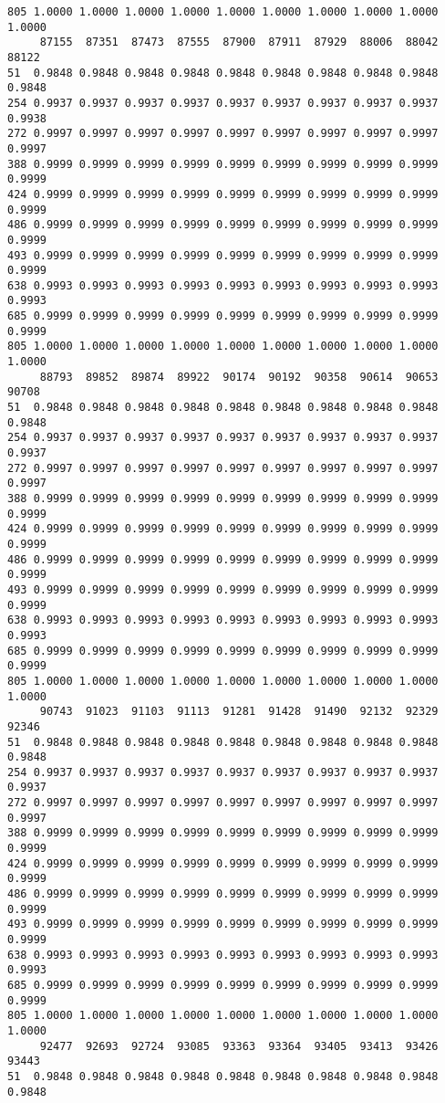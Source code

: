 \documentclass[
]{report}
\begin{document}
\begin{verbatim}
805 1.0000 1.0000 1.0000 1.0000 1.0000 1.0000 1.0000 1.0000 1.0000 1.0000
     87155  87351  87473  87555  87900  87911  87929  88006  88042  88122
51  0.9848 0.9848 0.9848 0.9848 0.9848 0.9848 0.9848 0.9848 0.9848 0.9848
254 0.9937 0.9937 0.9937 0.9937 0.9937 0.9937 0.9937 0.9937 0.9937 0.9938
272 0.9997 0.9997 0.9997 0.9997 0.9997 0.9997 0.9997 0.9997 0.9997 0.9997
388 0.9999 0.9999 0.9999 0.9999 0.9999 0.9999 0.9999 0.9999 0.9999 0.9999
424 0.9999 0.9999 0.9999 0.9999 0.9999 0.9999 0.9999 0.9999 0.9999 0.9999
486 0.9999 0.9999 0.9999 0.9999 0.9999 0.9999 0.9999 0.9999 0.9999 0.9999
493 0.9999 0.9999 0.9999 0.9999 0.9999 0.9999 0.9999 0.9999 0.9999 0.9999
638 0.9993 0.9993 0.9993 0.9993 0.9993 0.9993 0.9993 0.9993 0.9993 0.9993
685 0.9999 0.9999 0.9999 0.9999 0.9999 0.9999 0.9999 0.9999 0.9999 0.9999
805 1.0000 1.0000 1.0000 1.0000 1.0000 1.0000 1.0000 1.0000 1.0000 1.0000
     88793  89852  89874  89922  90174  90192  90358  90614  90653  90708
51  0.9848 0.9848 0.9848 0.9848 0.9848 0.9848 0.9848 0.9848 0.9848 0.9848
254 0.9937 0.9937 0.9937 0.9937 0.9937 0.9937 0.9937 0.9937 0.9937 0.9937
272 0.9997 0.9997 0.9997 0.9997 0.9997 0.9997 0.9997 0.9997 0.9997 0.9997
388 0.9999 0.9999 0.9999 0.9999 0.9999 0.9999 0.9999 0.9999 0.9999 0.9999
424 0.9999 0.9999 0.9999 0.9999 0.9999 0.9999 0.9999 0.9999 0.9999 0.9999
486 0.9999 0.9999 0.9999 0.9999 0.9999 0.9999 0.9999 0.9999 0.9999 0.9999
493 0.9999 0.9999 0.9999 0.9999 0.9999 0.9999 0.9999 0.9999 0.9999 0.9999
638 0.9993 0.9993 0.9993 0.9993 0.9993 0.9993 0.9993 0.9993 0.9993 0.9993
685 0.9999 0.9999 0.9999 0.9999 0.9999 0.9999 0.9999 0.9999 0.9999 0.9999
805 1.0000 1.0000 1.0000 1.0000 1.0000 1.0000 1.0000 1.0000 1.0000 1.0000
     90743  91023  91103  91113  91281  91428  91490  92132  92329  92346
51  0.9848 0.9848 0.9848 0.9848 0.9848 0.9848 0.9848 0.9848 0.9848 0.9848
254 0.9937 0.9937 0.9937 0.9937 0.9937 0.9937 0.9937 0.9937 0.9937 0.9937
272 0.9997 0.9997 0.9997 0.9997 0.9997 0.9997 0.9997 0.9997 0.9997 0.9997
388 0.9999 0.9999 0.9999 0.9999 0.9999 0.9999 0.9999 0.9999 0.9999 0.9999
424 0.9999 0.9999 0.9999 0.9999 0.9999 0.9999 0.9999 0.9999 0.9999 0.9999
486 0.9999 0.9999 0.9999 0.9999 0.9999 0.9999 0.9999 0.9999 0.9999 0.9999
493 0.9999 0.9999 0.9999 0.9999 0.9999 0.9999 0.9999 0.9999 0.9999 0.9999
638 0.9993 0.9993 0.9993 0.9993 0.9993 0.9993 0.9993 0.9993 0.9993 0.9993
685 0.9999 0.9999 0.9999 0.9999 0.9999 0.9999 0.9999 0.9999 0.9999 0.9999
805 1.0000 1.0000 1.0000 1.0000 1.0000 1.0000 1.0000 1.0000 1.0000 1.0000
     92477  92693  92724  93085  93363  93364  93405  93413  93426  93443
51  0.9848 0.9848 0.9848 0.9848 0.9848 0.9848 0.9848 0.9848 0.9848 0.9848

\end{verbatim}
\end{document}
